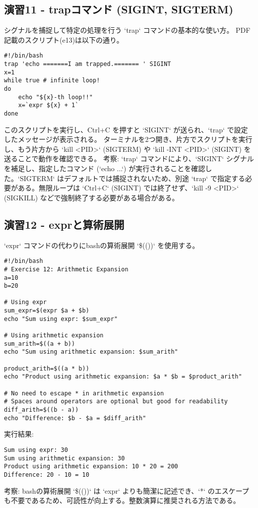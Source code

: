 \documentclass[a4paper,11pt]{jsarticle}
\begin{document}
\subsection*{演習11 - trapコマンド (SIGINT, SIGTERM)}
シグナルを捕捉して特定の処理を行う `trap` コマンドの基本的な使い方。
PDF記載のスクリプト(e13)は以下の通り。
\begin{lstlisting}[caption=演習11 trapコマンドのスクリプト例 (e13)]
#!/bin/bash
trap 'echo =======I am trapped.======= ' SIGINT
x=1
while true # infinite loop!
do
    echo "${x}-th loop!!"
    x=`expr ${x} + 1`
done
\end{lstlisting}
このスクリプトを実行し、Ctrl+C を押すと `SIGINT` が送られ、`trap` で設定したメッセージが表示される。
ターミナルを2つ開き、片方でスクリプトを実行し、もう片方から `kill <PID>` (SIGTERM) や `kill -INT <PID>` (SIGINT) を送ることで動作を確認できる。
考察: `trap` コマンドにより、`SIGINT` シグナルを補足し、指定したコマンド (`echo ...`) が実行されることを確認した。`SIGTERM` はデフォルトでは捕捉されないため、別途 `trap` で指定する必要がある。無限ループは `Ctrl+C` (SIGINT) では終了せず、`kill -9 <PID>` (SIGKILL) などで強制終了する必要がある場合がある。

\subsection*{演習12 - exprと算術展開}
`expr` コマンドの代わりにbashの算術展開 `\$(())` を使用する。
\begin{lstlisting}[caption=演習12 算術展開のスクリプト例]
#!/bin/bash
# Exercise 12: Arithmetic Expansion
a=10
b=20

# Using expr
sum_expr=$(expr $a + $b)
echo "Sum using expr: $sum_expr"

# Using arithmetic expansion
sum_arith=$((a + b))
echo "Sum using arithmetic expansion: $sum_arith"

product_arith=$((a * b))
echo "Product using arithmetic expansion: $a * $b = $product_arith"

# No need to escape * in arithmetic expansion
# Spaces around operators are optional but good for readability
diff_arith=$((b - a))
echo "Difference: $b - $a = $diff_arith"
\end{lstlisting}
実行結果:
\begin{verbatim}
Sum using expr: 30
Sum using arithmetic expansion: 30
Product using arithmetic expansion: 10 * 20 = 200
Difference: 20 - 10 = 10
\end{verbatim}
考察: bashの算術展開 `\$(())` は `expr` よりも簡潔に記述でき、`*` のエスケープも不要であるため、可読性が向上する。整数演算に推奨される方法である。
\end{document}
